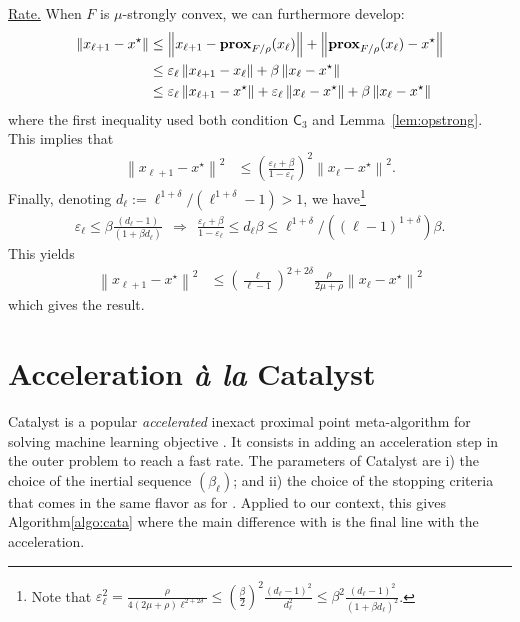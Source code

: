 \vspace*{1ex}
\noindent\underline{Rate.} When $F$ is $\mu$-strongly convex, we can furthermore develop:
\begin{align*}
    \left\| x_{\ell+1} - x^\star \right\| &\leq \left\| x_{\ell+1} - \mathbf{prox}_{F/\rho}(x_\ell) \right\| + \left\|\mathbf{prox}_{F/\rho}(x_\ell) - x^\star \right\| \\
    &\leq \varepsilon_\ell \left\| x_{\ell+1} - x_\ell \right\| + \beta \left\|x_\ell - x^\star \right\| \\
    &\leq  \varepsilon_\ell \left\| x_{\ell+1} - x^\star \right\|  + \varepsilon_\ell \left\| x_{\ell} - x^\star \right\| + \beta \left\|x_\ell - x^\star \right\|
\end{align*}
where the first inequality used both condition $\mathsf{C}_3$ and Lemma~\ref{lem:opstrong}. This implies that 
\begin{align*}
    \left\| x_{\ell+1} - x^\star \right\|^2 &\leq \left( \frac{\varepsilon_\ell + \beta}{1 - \varepsilon_\ell} \right)^2  \left\|x_\ell - x^\star \right\|^2 .
\end{align*}
Finally, denoting $d_\ell := \ell^{1+\delta}/(\ell^{1+\delta}-1) > 1 $, we have\footnote{Note that $
   \varepsilon_\ell^2 = \frac{\rho}{4(2\mu+\rho) \ell^{2+2\delta}} \leq \left( \frac{\beta}{2} \right)^2 \frac{(d_\ell-1)^2}{d_\ell^2} \leq \beta^2 \frac{(d_\ell-1)^2}{(1+\beta d_\ell)^2} $.}
\begin{align*}
    \varepsilon_\ell \leq \beta \frac{(d_\ell-1)}{(1+\beta d_\ell)} ~~\Longrightarrow~~ \frac{\varepsilon_\ell + \beta}{1 - \varepsilon_\ell} \leq d_\ell \beta \leq \ell^{1+\delta}/((\ell-1)^{1+\delta}) \beta.
\end{align*}
This yields
\begin{align*}
    \left\| x_{\ell+1} - x^\star \right\|^2 &\leq \left( \frac{\ell}{\ell-1} \right)^{2+2\delta} \frac{{\rho }}{2\mu + {\rho }} \left\|x_\ell - x^\star \right\|^2 
\end{align*}
which gives the result.



\section{Acceleration \emph{à la} Catalyst}\label{apx:cata} 
Catalyst is a popular \emph{accelerated} inexact proximal point meta-algorithm for solving machine learning objective \cite{lin2015universal,lin2017catalyst}.
It consists in adding an acceleration step in the outer problem to reach a fast rate. The parameters of Catalyst are i) the choice of the inertial sequence $(\beta_\ell)$; and ii) the choice of the stopping criteria that comes in the same flavor as for \recoalgo. Applied to our context, this gives Algorithm\;\ref{algo:cata} where the main difference with \recoalgo is the final line with the acceleration. 

